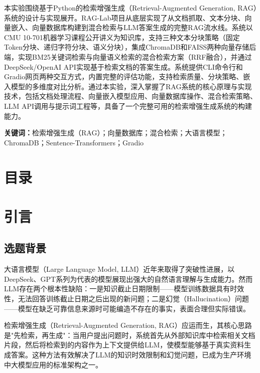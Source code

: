 \documentclass[10pt,a4paper]{article}
\begin{document}
本实验围绕基于Python的检索增强生成（Retrieval-Augmented Generation, RAG）系统的设计与实现展开。RAG-Lab项目从底层实现了从文档抓取、文本分块、向量嵌入、向量数据库构建到混合检索与LLM答案生成的完整RAG流水线。系统以CMU 10-701机器学习课程公开讲义为知识库，支持三种文本分块策略（固定Token分块、递归字符分块、语义分块），集成ChromaDB和FAISS两种向量存储后端，实现BM25关键词检索与向量语义检索的混合检索方案（RRF融合），并通过DeepSeek/OpenAI API实现基于检索文档的答案生成。系统提供CLI命令行和Gradio网页两种交互方式，内置完整的评估功能，支持检索质量、分块策略、嵌入模型的多维度对比分析。通过本实验，深入掌握了RAG系统的核心原理与实现技术，包括文档处理流程、向量嵌入模型应用、向量数据库操作、混合检索策略、LLM API调用与提示词工程等，具备了一个完整可用的检索增强生成系统的构建能力。

\medskip
\noindent\textbf{关键词：}检索增强生成（RAG）；向量数据库；混合检索；大语言模型；ChromaDB；Sentence-Transformers；Gradio

\newpage

\section*{目\quad 录}
\renewcommand{\contentsname}{}
\tableofcontents

\newpage

\section{引言}

\subsection{选题背景}

大语言模型（Large Language Model, LLM）近年来取得了突破性进展，以DeepSeek、GPT系列为代表的模型展现出强大的自然语言理解与生成能力。然而LLM存在两个根本性缺陷：一是知识截止日期限制——模型训练数据具有时效性，无法回答训练截止日期之后出现的新问题；二是幻觉（Hallucination）问题——模型在缺乏可靠信息来源时可能编造不存在的事实，表面合理但实际错误。

检索增强生成（Retrieval-Augmented Generation, RAG）应运而生，其核心思路是"先检索，再生成"：当用户提出问题时，系统首先从外部知识库中检索相关文档片段，然后将检索到的内容作为上下文提供给LLM，使模型能够基于真实资料生成答案。这种方法有效解决了LLM的知识时效限制和幻觉问题，已成为生产环境中大模型应用的标准架构之一。
\end{document}
